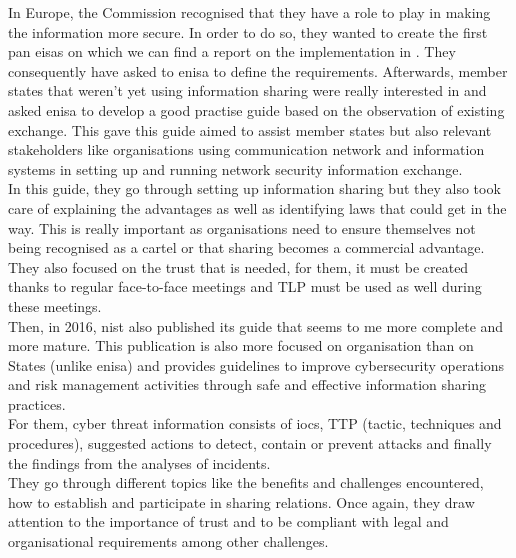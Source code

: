 \documentclass{eplmastersthesis}
\begin{document}
In Europe, the Commission recognised that they have a role to play in making the information more secure. In order to do so, they wanted to create the first pan \gls{eisas} on which we can find a report on the implementation in \cite{eisasRapport}.  They consequently have asked to \gls{enisa} to define the requirements. Afterwards, member states that weren't yet using information sharing were really interested in and asked \gls{enisa} to develop a good practise guide based on the observation of existing exchange. This gave this guide \cite{enisaguide2009} aimed to assist member states but also relevant stakeholders like organisations using communication network and information systems in setting up and running network security information exchange.\\
In this guide, they go through setting up information sharing but they also took care of explaining the advantages as well as identifying laws that could get in the way. This is really important as organisations need to ensure themselves not being recognised as a cartel or that sharing becomes a commercial advantage. They also focused on the trust that is needed, for them, it must be created thanks to regular face-to-face meetings and TLP must be used as well during these meetings.\\
Then, in 2016, \gls{nist} also published its guide \cite{johnson2014guide} that seems to me more complete and more mature. This publication is also more focused on organisation than on States (unlike \gls{enisa}) and provides guidelines to improve cybersecurity operations and risk management activities through safe and effective information sharing practices.\\
For them, cyber threat information consists of \gls{ioc}s, TTP (tactic, techniques and procedures), suggested actions to detect, contain or prevent attacks and finally the findings from the analyses of incidents. \\
They go through different topics like the benefits and challenges encountered, how to establish and participate in sharing relations. Once again, they draw attention to the importance of trust and to be compliant with legal and organisational requirements among other challenges.\\
\end{document}
